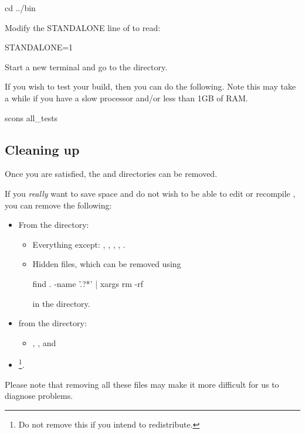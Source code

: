 \begin{shellCode}
cd ../bin
\end{shellCode}

Modify the STANDALONE line of  to read:
 
STANDALONE=1

Start a new terminal and go to the  directory.


If you wish to test your build, then you can do the following. 
Note this may take a while if you have a slow processor and/or less than 1GB of RAM.
\begin{shellCode}
scons all_tests
\end{shellCode}

\subsection{Cleaning up}
Once you are satisfied, the  and  directories can be removed.

If you \emph{really} want to save space and do not wish to be able to edit or recompile \esfinley, you can remove the following:
\begin{itemize}
 \item From the  directory:\begin{itemize}
\item Everything except: , , , ,
.
\item Hidden files, which can be removed using
\begin{shellCode}
find . -name '.?*' | xargs rm -rf
\end{shellCode}
in the  directory.
\end{itemize}
\item from the  directory:
\begin{itemize}
\item  {}, ,  and 
\end{itemize}
\item {}\footnote{Do not remove this if you intend to redistribute.}.
\end{itemize}

Please note that removing all these files may make it more difficult for us to diagnose problems.


